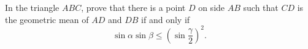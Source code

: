 
\begin{exercise}[2/1974]
    In the triangle $ABC$, prove that there is a point $D$ on side $AB$ such that $CD$ is the geometric mean of $AD$ and $DB$ if and only if
    \begin{equation}
        \sin \alpha \sin \beta \le \left(\sin \frac \gamma 2\right)^2.
    \end{equation}
\end{exercise}
